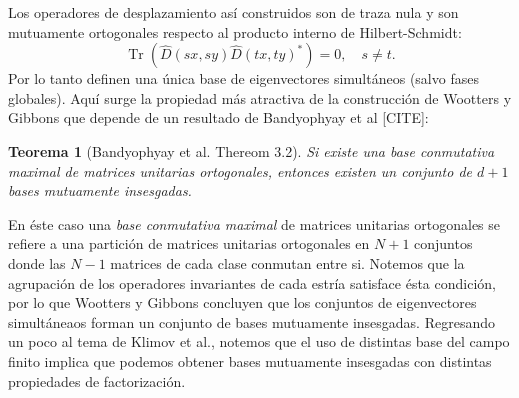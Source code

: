 \documentclass[a4paper]{report}
\DeclareMathOperator{\Tr}{Tr}
\newtheorem{theorem}{Teorema}
\begin{document}
  Los operadores de desplazamiento así construidos son de
  traza nula y son mutuamente ortogonales respecto al
  producto interno de Hilbert-Schmidt:
  \[
    \Tr\left( \hat D(sx,sy) \hat D(tx,ty)^{*} \right) 
    = 0,
    \quad s \neq t.
  \] 
  Por lo tanto definen una única base de eigenvectores
  simultáneos (salvo fases globales). Aquí surge la
  propiedad más atractiva de la construcción de Wootters y
  Gibbons que depende de un resultado de Bandyophyay et al
  [CITE]:
  \begin{theorem}[Bandyophyay et al. Thereom 3.2]
    Si existe una base conmutativa maximal de matrices
    unitarias ortogonales, entonces existen un conjunto de
    $d+1$ bases mutuamente insesgadas.
  \end{theorem}
  En éste caso una \textit{base conmutativa maximal} de
  matrices unitarias ortogonales se refiere a una partición
  de matrices unitarias ortogonales en $N+1$ conjuntos donde
  las $N-1$ matrices de cada clase conmutan entre si.
  Notemos que la agrupación de los operadores invariantes de
  cada estría satisface ésta condición, por lo que Wootters
  y Gibbons concluyen que los conjuntos de eigenvectores
  simultáneaos forman un conjunto de bases mutuamente
  insesgadas. Regresando un poco al tema de Klimov et al.,
  notemos que el uso de distintas base del campo finito
  implica que podemos obtener bases mutuamente insesgadas
  con distintas propiedades de factorización.
\end{document}
